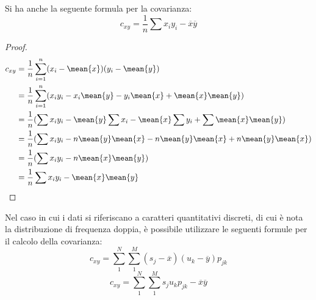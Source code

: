 \documentclass[a4paper,12pt, oneside]{book}
\begin{document}
Si ha anche la seguente formula per la covarianza:
\[ c_{xy} = \frac{1}{n} \sum x_iy_i - \overline{x}\overline{y} \]
\begin{proof}
        \[ \begin{split}
                c_{xy} & = \frac{1}{n} \sum _{i = 1} ^ n (x_i - \mean{x}) (y_i - \mean{y}) \\
                       & = \frac{1}{n} \sum _{i = 1} ^ n (x_iy_i - x_i\mean{y} - y_i \mean{x} + \mean{x}\mean{y}) \\
                       & = \frac{1}{n} (\sum x_iy_i - \mean{y} \sum x_i - \mean{x} \sum y_i + \sum \mean{x}\mean{y}) \\
                       & = \frac{1}{n} (\sum x_iy_i - n\mean{y}\mean{x} - n\mean{y}\mean{x} + n\mean{y}\mean{x}) \\
                       & = \frac{1}{n} (\sum x_iy_i - n\mean{x}\mean{y}) \\
                       & = \frac{1}{n} \sum x_iy_i - \mean{x}\mean{y} \\
            \end{split} \]
\end{proof}
Nel caso in cui i dati si riferiscano a caratteri quantitativi discreti, di cui è nota la
distribuzione di frequenza doppia, è possibile utilizzare le seguenti formule per il calcolo della covarianza:
\[ c_{xy}=\sum_1^N\sum_1^M(s_j-\overline{x})(u_k-\overline{y})p_{jk} \]
\[c_{xy}=\sum_1^N\sum_1^Ms_ju_kp_{jk}-\overline{x}\overline{y} \]
\end{document}
